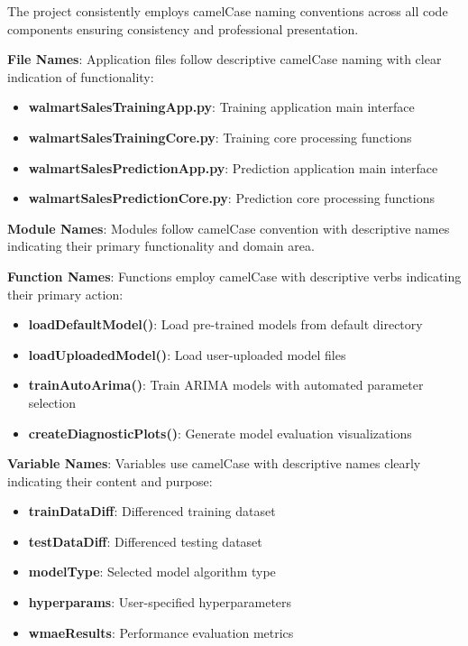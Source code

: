 The project consistently employs camelCase naming conventions across all code components ensuring consistency and professional presentation.

\textbf{File Names}: Application files follow descriptive camelCase naming with clear indication of functionality:
\begin{itemize}
	\item \textbf{walmartSalesTrainingApp.py}: Training application main interface
	\item \textbf{walmartSalesTrainingCore.py}: Training core processing functions
	\item \textbf{walmartSalesPredictionApp.py}: Prediction application main interface
	\item \textbf{walmartSalesPredictionCore.py}: Prediction core processing functions
\end{itemize}

\textbf{Module Names}: Modules follow camelCase convention with descriptive names indicating their primary functionality and domain area.

\textbf{Function Names}: Functions employ camelCase with descriptive verbs indicating their primary action:
\begin{itemize}
	\item \textbf{loadDefaultModel()}: Load pre-trained models from default directory
	\item \textbf{loadUploadedModel()}: Load user-uploaded model files
	\item \textbf{trainAutoArima()}: Train ARIMA models with automated parameter selection
	\item \textbf{createDiagnosticPlots()}: Generate model evaluation visualizations
\end{itemize}

\textbf{Variable Names}: Variables use camelCase with descriptive names clearly indicating their content and purpose:
\begin{itemize}
	\item \textbf{trainDataDiff}: Differenced training dataset
	\item \textbf{testDataDiff}: Differenced testing dataset  
	\item \textbf{modelType}: Selected model algorithm type
	\item \textbf{hyperparams}: User-specified hyperparameters
	\item \textbf{wmaeResults}: Performance evaluation metrics
\end{itemize}

